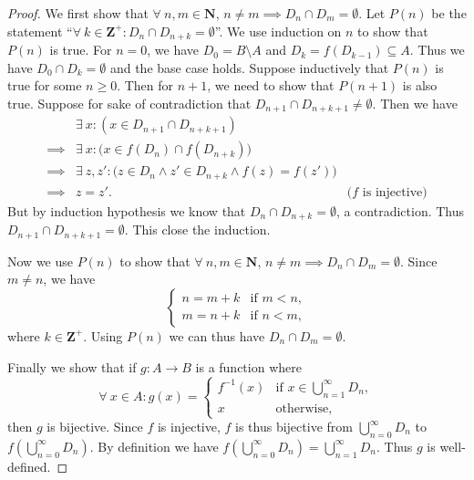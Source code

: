 \begin{proof}
    We first show that \(\forall\ n, m \in \mathbf{N}\), \(n \neq m \implies D_n \cap D_m = \emptyset\).
    Let \(P(n)\) be the statement ``\(\forall\ k \in \mathbf{Z}^+ : D_n \cap D_{n + k} = \emptyset\)''.
    We use induction on \(n\) to show that \(P(n)\) is true.
    For \(n = 0\), we have \(D_0 = B \setminus A\) and \(D_k = f(D_{k - 1}) \subseteq A\).
    Thus we have \(D_0 \cap D_k = \emptyset\) and the base case holds.
    Suppose inductively that \(P(n)\) is true for some \(n \geq 0\).
    Then for \(n + 1\), we need to show that \(P(n + 1)\) is also true.
    Suppose for sake of contradiction that \(D_{n + 1} \cap D_{n + k + 1} \neq \emptyset\).
    Then we have
    \begin{align*}
                 & \exists\ x : (x \in D_{n + 1} \cap D_{n + k + 1})                                                            \\
        \implies & \exists\ x : \big(x \in f(D_n) \cap f(D_{n + k})\big)                                                        \\
        \implies & \exists\ z, z' : \big(z \in D_n \land z' \in D_{n + k} \land f(z) = f(z')\big)                               \\
        \implies & z = z'.                                                                        & \text{(\(f\) is injective)}
    \end{align*}
    But by induction hypothesis we know that \(D_n \cap D_{n + k} = \emptyset\), a contradiction.
    Thus \(D_{n + 1} \cap D_{n + k + 1} = \emptyset\).
    This close the induction.

    Now we use \(P(n)\) to show that \(\forall\ n, m \in \mathbf{N}\), \(n \neq m \implies D_n \cap D_m = \emptyset\).
    Since \(m \neq n\), we have
    \[
        \begin{cases}
            n = m + k & \text{if } m < n, \\
            m = n + k & \text{if } n < m,
        \end{cases}
    \]
    where \(k \in \mathbf{Z}^+\).
    Using \(P(n)\) we can thus have \(D_n \cap D_m = \emptyset\).

    Finally we show that if \(g : A \to B\) is a function where
    \[
        \forall\ x \in A : g(x) = \begin{cases}
            f^{-1}(x) & \text{if } x \in \bigcup_{n = 1}^\infty D_n, \\
            x         & \text{otherwise},
        \end{cases}
    \]
    then \(g\) is bijective.
    Since \(f\) is injective, \(f\) is thus bijective from \(\bigcup_{n = 0}^\infty D_n\) to \(f(\bigcup_{n = 0}^\infty D_n)\).
    By definition we have \(f(\bigcup_{n = 0}^\infty D_n) = \bigcup_{n = 1}^\infty D_n\).
    Thus \(g\) is well-defined.


\end{proof}

